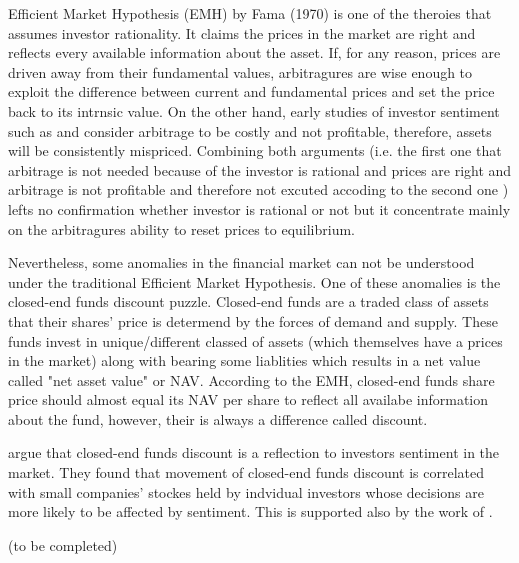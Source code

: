 \documentclass[12pt]{article}																																															%
\begin{document}
\par Efficient Market Hypothesis (EMH) by Fama (1970) is one of the theroies that assumes investor rationality. It claims the prices in the market are right and reflects every available information about the asset. If, for any reason, prices are driven away from their fundamental values, arbitragures are wise enough to exploit the difference between current and fundamental prices and set the price back to its intrnsic value. On the other hand, early studies of investor sentiment such as \cite{Lee1991, Sanders1997} and \cite{DeBondt1998} consider arbitrage to be costly and not profitable, therefore, assets will be consistently mispriced. Combining both arguments (i.e. the first one that arbitrage is not needed because of the investor is rational and prices are right and arbitrage is not profitable and therefore not excuted accoding to the second one ) lefts no confirmation whether investor is rational or not but it concentrate mainly on the arbitragures ability to reset prices to equilibrium. 
\par Nevertheless, some anomalies in the financial market can not be understood under the traditional Efficient Market Hypothesis. One of these anomalies is the closed-end funds discount puzzle. Closed-end funds are a traded class of assets that their shares' price is determend by the forces of demand and supply. These funds invest in unique/different classed of assets (which themselves have a prices in the market) along with bearing some liablities which results in a net value called "net asset value" or NAV. According to the EMH, closed-end funds share price should almost equal its NAV per share to reflect all availabe information about the fund, however, their is always a difference called discount.
\par \cite{Lee1991} argue that closed-end funds discount is a reflection to investors sentiment in the market. They found that movement of closed-end funds discount is correlated with small companies' stockes held by indvidual investors whose decisions are more likely to be affected by sentiment. This is supported also by the work of \cite{GregoryM.Noronha1995, Chen2003, Chen1993, JamesN.BodurthaDong-SoonKim1995}.

(to be completed)
\end{document}
